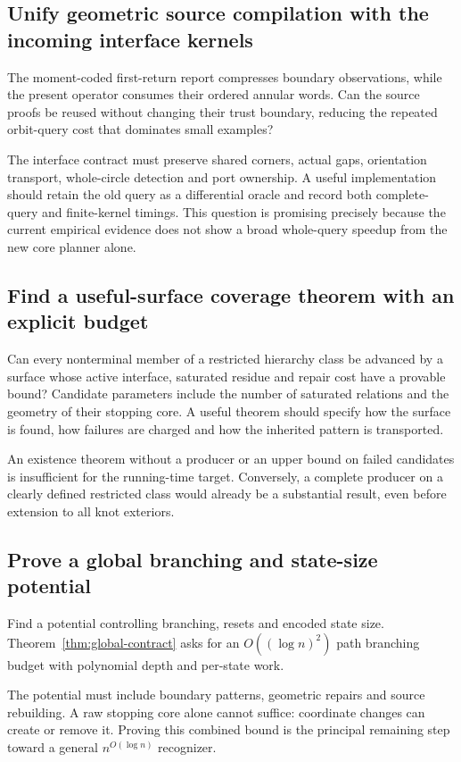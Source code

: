 \subsection{Unify geometric source compilation with the incoming interface kernels}

The moment-coded first-return report compresses boundary observations,
while the present operator consumes their ordered annular words. Can the
source proofs be reused without changing their trust boundary, reducing
the repeated orbit-query cost that dominates small examples?

The interface contract must preserve shared corners, actual gaps,
orientation transport, whole-circle detection and port ownership. A
useful implementation should retain the old query as a differential
oracle and record both complete-query and finite-kernel timings. This
question is promising precisely because the current empirical evidence
does not show a broad whole-query speedup from the new core planner alone.

\subsection{Find a useful-surface coverage theorem with an explicit budget}

Can every nonterminal member of a restricted hierarchy class be advanced
by a surface whose active interface, saturated residue and repair cost
have a provable bound? Candidate parameters include the number of
saturated relations and the geometry of their stopping core. A useful
theorem should specify how the surface is found, how failures are
charged and how the inherited pattern is transported.

An existence theorem without a producer or an upper bound on failed
candidates is insufficient for the running-time target. Conversely, a
complete producer on a clearly defined restricted class would already
be a substantial result, even before extension to all knot exteriors.

\subsection{Prove a global branching and state-size potential}

Find a potential controlling branching, resets and encoded state size.
Theorem~\ref{thm:global-contract} asks for an $O((\log n)^2)$ path
branching budget with polynomial depth and per-state work.

The potential must include boundary patterns, geometric repairs and
source rebuilding. A raw stopping core alone cannot suffice: coordinate
changes can create or remove it. Proving this combined bound is the
principal remaining step toward a general $n^{O(\log n)}$ recognizer.
